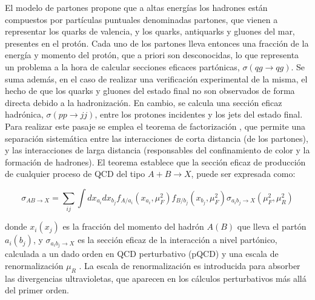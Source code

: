 El modelo de partones propone que a altas energías los hadrones están compuestos por partículas puntuales denominadas partones, que vienen a representar los quarks de valencia, y los quarks, antiquarks y gluones del mar, presentes en el protón. Cada uno de los partones lleva entonces una fracción de la energía y momento del protón, que a priori son desconocidas, lo que representa un problema a la hora de calcular secciones eficaces partónicas, $\sigma(qg\to qg)$.
Se suma además, en el caso de realizar una verificación experimental de la misma, el hecho de que los quarks y gluones del estado final no son observados de forma directa debido a la hadronización. En cambio, se calcula una sección eficaz hadrónica, $\sigma(pp\to jj)$, entre los protones incidentes y los jets del estado final. Para realizar este pasaje se emplea el teorema de factorización \cite{ELLIS1978281}, que permite una separación sistemática
entre las interacciones de corta distancia (de los partones), y las interacciones de larga distancia (responsables del confinamiento de color y la formación de hadrones). El teorema establece que la sección eficaz de producción de cualquier proceso de QCD del tipo $A+B\to X$, puede ser expresada como:


\begin{equation}
	\sigma_{AB\to X} = \sum_{ij} \int dx_{a_i} dx_{b_j} f_{A/a_i}(x_{a_i}, \mu_{F}^2) f_{B/b_j}(x_{b_j}, \mu_{F}^2) \sigma_{a_i b_j \to X}(\mu_{F}^2, \mu_{R}^2)
	\label{eq:xs_fact}
\end{equation}

\noindent
donde $x_i(x_j)$ es la fracción del momento del hadrón $A(B)$ que lleva el partón $a_i(b_j)$, y $\sigma_{a_i b_j \to X}$ es la sección eficaz de la interacción a nivel partónico, calculada a un dado orden en QCD perturbativo (pQCD) y una escala de renormalización $\mu_R$ \cite{Tripiana:1433788,Wahlberg:2005gi}. La escala de renormalización es introducida
para absorber las divergencias ultravioletas, que aparecen en los cálculos perturbativos más
allá del primer orden.

